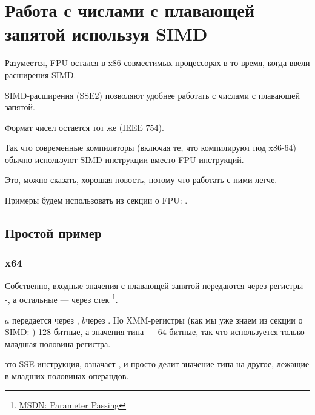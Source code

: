 \chapter{Работа с числами с плавающей запятой используя SIMD}

\label{floating_SIMD}
Разумеется, FPU остался в x86-совместимых процессорах в то время, когда ввели расширения \ac{SIMD}.

\ac{SIMD}-расширения (SSE2) позволяют удобнее работать с числами с плавающей запятой.

Формат чисел остается тот же (IEEE 754).

Так что современные компиляторы (включая те, что компилируют под x86-64) 
обычно используют \ac{SIMD}-инструкции вместо FPU-инструкций.

Это, можно сказать, хорошая новость, потому что работать с ними легче.

Примеры будем использовать из секции о FPU: .

\section{Простой пример}



\subsection{x64}



Собственно, входные значения с плавающей запятой передаются через регистры -, 
а остальные --- через стек
\footnote{\href{http://go.yurichev.com/17263}{MSDN: Parameter Passing}}.

$a$ передается через , $b$\EMDASH{}через .
Но XMM-регистры (как мы уже знаем из секции о \ac{SIMD}: ) 128-битные, 
а значения типа \Tdouble --- 64-битные,
так что используется только младшая половина регистра.

 это SSE-инструкция, означает 
, 
и просто делит значение типа \Tdouble на другое, лежащие в младших половинах операндов.

